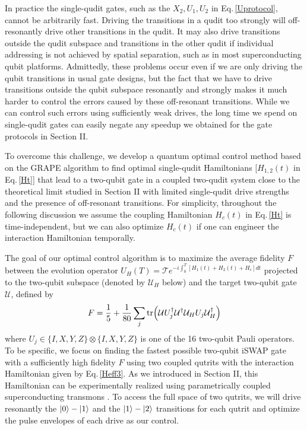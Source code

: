 \documentclass[twocolumn,english,pra,superscriptaddress]{revtex4-1}
\begin{document}
In practice the single-qudit gates, such as the $X_2, U_1, U_2$ in Eq.\,\eqref{Uprotocol}, cannot be arbitrarily fast. Driving the transitions in a qudit too strongly will off-resonantly drive other transitions in the qudit. It may also drive transitions outside the qudit subspace and transitions in the other qudit if individual addressing is not achieved by spatial separation, such as in most superconducting qubit platforms. Admittedly, these problems occur even if we are only driving the qubit transitions in usual gate designs, but the fact that we have to drive transitions outside the qubit subspace resonantly and strongly makes it much harder to control the errors caused by these off-resonant transitions. While we can control such errors using sufficiently weak drives, the long time we spend on single-qudit gates can easily negate any speedup we obtained for the gate protocols in Section II.

To overcome this challenge, we develop a quantum optimal control method based on the GRAPE algorithm \cite{GRAPE} to find optimal single-qudit Hamiltonians [$H_{1,2}(t)$ in Eq.\,\eqref{Ht}] that lead to a two-qubit gate in a coupled two-qudit system close to the theoretical limit studied in Section II with limited single-qudit drive strengths and the presence of off-resonant transitions. For simplicity, throughout the following discussion we assume the coupling Hamiltonian $H_c(t)$ in Eq.\,\eqref{Ht} is time-independent, but we can also optimize $H_c(t)$ if one can engineer the interaction Hamiltonian temporally.

The goal of our optimal control algorithm is to maximize the average fidelity $F$ between the evolution operator $U_H(T)=\mathcal{T}e^{-i\int^T_0 [H_1(t)+H_2(t)+H_c]dt}$ projected to the two-qubit subspace (denoted by $\mathcal{U}_H$ below) and the target two-qubit gate $\mathcal{U}$, defined by \cite{NielsenF}
\begin{equation}\label{F}
    F = \frac{1}{5} + \frac{1}{80} \sum_j \tr(\mathcal{U}U_j^\dagger \mathcal{U}^\dagger \mathcal{U}_H U_j \mathcal{U}_H^\dagger)
\end{equation}
where $U_j \in \{I,X,Y,Z\} \otimes \{I,X,Y,Z\}$ is one of the 16 two-qubit Pauli operators. To be specific, we focus on finding the fastest possible two-qubit iSWAP gate with a sufficiently high fidelity $F$ using two coupled qutrits with the interaction Hamiltonian given by Eq.\,\eqref{Heff3}. As we introduced in Section II, this Hamiltonian can be experimentally realized using parametrically coupled superconducting transmons \cite{RayParam}. To access the full space of two qutrits, we will drive resonantly the $\ket{0}-\ket{1}$ and the $\ket{1}-\ket{2}$ transitions for each qutrit and optimize the pulse envelopes of each drive as our control.
\end{document}
